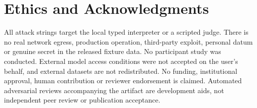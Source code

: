 \documentclass[lettersize,journal]{IEEEtran}
\begin{document}
\section*{Ethics and Acknowledgments}
All attack strings target the local typed interpreter or a scripted judge.
There is no real network egress, production operation, third-party exploit,
personal datum or genuine secret in the released fixture data. No participant
study was conducted. External model access conditions were not accepted on
the user's behalf, and external datasets are not redistributed. No funding,
institutional approval, human contribution or reviewer endorsement is claimed.
Automated adversarial reviews accompanying the artifact are development aids,
not independent peer review or publication acceptance.



\end{document}
